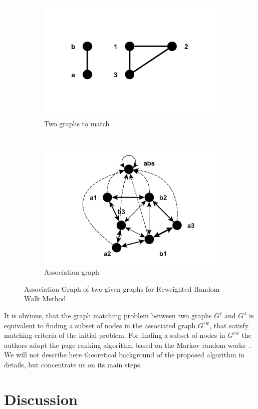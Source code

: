\begin{figure}[h!]
\label{fig:RRWM}
	\centering
    \begin{subfigure}[b]{0.3\textwidth}
        \includegraphics[width=\textwidth]{chapter1/fig/RRWM1}
        \caption{Two graphs to match}
        \label{fig:RRWM1}
    \end{subfigure}
    ~
    \begin{subfigure}[b]{0.3\textwidth}
        \includegraphics[width=\textwidth]{chapter1/fig/RRWM2}
        \caption{Association graph}
        \label{fig:RRWM2}
    \end{subfigure}
\caption{Association Graph of two given graphs for Reweighted Random Walk Method}
\end{figure}

It is obvious, that the graph matching problem between two graphs $G^I$ and $G^J$ is equivalent to finding a subset of nodes in the associated graph $G^{rw}$, that satisfy matching criteria of the initial problem.
For finding a subset of nodes in $G^{rw}$ the authors adopt the page ranking algorithm based on the Markov random works~\cite{PageRank}. We will not describe here theoretical background of the proposed algorithm in details, but concentrate us on its main steps.


\section{Discussion}